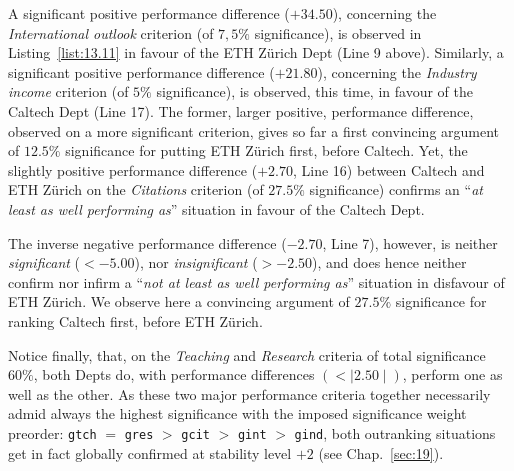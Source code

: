 A significant positive performance difference ($+34.50$), concerning the \emph{International outlook} criterion (of $7,5\%$ significance), is observed in Listing~\vref{list:13.11} in favour of the ETH Zürich Dept (Line 9 above). Similarly, a significant positive performance difference ($+21.80$), concerning the \emph{Industry income} criterion (of $5\%$ significance), is observed, this time, in favour of the Caltech Dept (Line 17). The former, larger positive, performance difference, observed on a more significant criterion, gives so far a first convincing argument of $12.5\%$ significance for putting ETH Zürich first, before Caltech. Yet, the slightly positive performance difference ($+2.70$, Line 16) between Caltech and ETH Zürich on the \emph{Citations} criterion (of $27.5\%$ significance) confirms an ``\emph{at least as well performing as}'' situation in favour of the Caltech Dept.

The inverse negative performance difference ($-2.70$, Line 7), however, is neither \emph{significant} ($< -5.00$), nor \emph{insignificant} ($> -2.50$), and does hence neither confirm nor infirm a ``\emph{not at least as well performing as}'' situation in disfavour of ETH Zürich. We observe here a convincing argument of $27.5\%$ significance for ranking Caltech first, before ETH Zürich.

Notice finally, that, on the \emph{Teaching} and \emph{Research} criteria of total significance $60\%$, both Depts do, with performance differences $(< \mid 2.50 \mid)$, perform one as well as the other. As these two major performance criteria together necessarily admid always the highest significance with the imposed significance weight preorder: \texttt{gtch} $=$ \texttt{gres} $>$ \texttt{gcit} $>$ \texttt{gint} $>$ \texttt{gind}, both outranking situations get in fact globally confirmed at stability level $+2$ (see Chap.~\ref{sec:19}).

